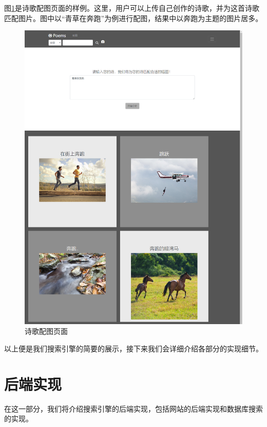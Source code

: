 \documentclass[a4paper, 10pt]{article}
\begin{document}
图\ref{fig:demo_matchimage}是诗歌配图页面的样例。这里，用户可以上传自己创作的诗歌，并为这首诗歌匹配图片。图中以“青草在奔跑”为例进行配图，结果中以奔跑为主题的图片居多。

\begin{figure}[H]
\centering
\includegraphics[scale=0.48]{fig/demo_matchimage.png}
\caption{诗歌配图页面}
\label{fig:demo_matchimage}
\end{figure}

以上便是我们搜索引擎的简要的展示，接下来我们会详细介绍各部分的实现细节。

\section{后端实现}
在这一部分，我们将介绍搜索引擎的后端实现，包括网站的后端实现和数据库搜索的实现。
\end{document}
